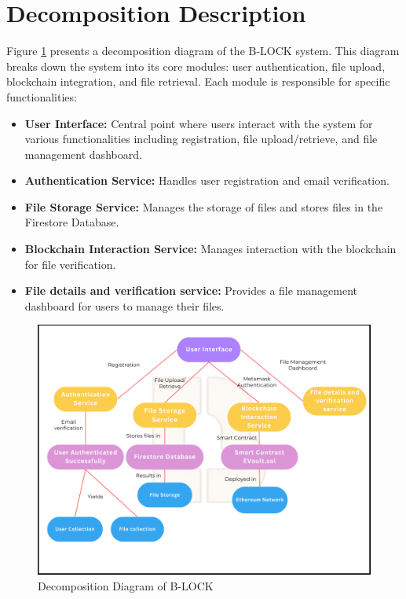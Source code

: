 \documentclass[12pt,a4paper]{report}
\begin{document}
\section{Decomposition Description}
Figure \ref{fig:flowchart} presents a decomposition diagram of the B-LOCK system. This diagram breaks down the system into its core modules: user authentication, file upload, blockchain integration, and file retrieval. Each module is responsible for specific functionalities:
\begin{itemize}
    \item \textbf{User Interface:} Central point where users interact with the system for various functionalities including registration, file upload/retrieve, and file management dashboard.
    \item \textbf{Authentication Service:} Handles user registration and email verification.
    \item \textbf{File Storage Service:} Manages the storage of files and stores files in the Firestore Database.
    \item \textbf{Blockchain Interaction Service:} Manages interaction with the blockchain for file verification.
    \item \textbf{File details and verification service:} Provides a file management dashboard for users to manage their files.
\end{itemize}
\begin{figure}[hbtp]
\centering
\includegraphics[scale=0.5]{./pic/decomposition.png}
\caption{Decomposition Diagram of B-LOCK}
\label{fig:flowchart} 
\end{figure}
\end{document}

